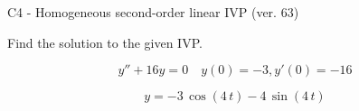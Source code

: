 \begin{exercise}
  \begin{exerciseTitle}C4 - Homogeneous second-order linear IVP (ver. 63)\end{exerciseTitle}
  \begin{exerciseStatement}
    
Find the solution to the given IVP.

    
\[y''+16y = 0 \hspace{1em} y(0) = -3 , y'(0) = -16\]

  \end{exerciseStatement}
  \begin{exerciseAnswer}
    
\[y= -3 \, \cos\left(4 \, t\right) - 4 \, \sin\left(4 \, t\right)\]

  \end{exerciseAnswer}
\end{exercise}